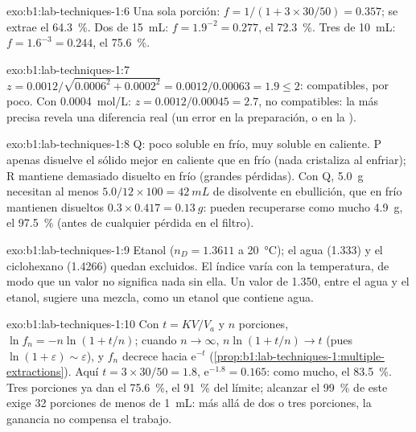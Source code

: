 \begin{solution}{exo:b1:lab-techniques-1:6}
Una sola porción: $f = 1/(1 + 3 \times 30/50) = 0.357$; se extrae el
\qty{64.3}{\percent}. Dos de \qty{15}{mL}: $f = 1.9^{-2} = 0.277$, el
\qty{72.3}{\percent}. Tres de \qty{10}{mL}: $f = 1.6^{-3} = 0.244$, el
\qty{75.6}{\percent}.
\end{solution}

\begin{solution}{exo:b1:lab-techniques-1:7}
$z = 0.0012/\sqrt{0.0006^2 + 0.0002^2} = 0.0012/0.00063 = 1.9 \le 2$:
compatibles, por poco. Con \qty{0.0004}{mol/L}: $z = 0.0012/0.00045 = 2.7$,
no compatibles: la  más precisa revela una diferencia real (un
error en la preparación, o en la ).
\end{solution}

\begin{solution}{exo:b1:lab-techniques-1:8}
Q: poco soluble en frío, muy soluble en caliente. P apenas disuelve el
sólido mejor en caliente que en frío (nada cristaliza al enfriar); R
mantiene demasiado disuelto en frío (grandes pérdidas). Con Q,
\qty{5.0}{g} necesitan al menos $5.0/12 \times 100 = \qty{42}{mL}$ de
disolvente en ebullición, que en frío mantienen disueltos
$0.3 \times 0.417 = \qty{0.13}{g}$: pueden recuperarse como mucho
\qty{4.9}{g}, el \qty{97.5}{\percent} (antes de cualquier pérdida en el
filtro).
\end{solution}

\begin{solution}{exo:b1:lab-techniques-1:9}
Etanol ($n_D = 1.3611$ a \qty{20}{\celsius}); el agua (1.333) y el
ciclohexano (1.4266) quedan excluidos. El índice varía con la
temperatura, de modo que un valor no significa nada sin ella. Un valor
de 1.350, entre el agua y el etanol, sugiere una mezcla, como un etanol
que contiene agua.
\end{solution}

\begin{solution}{exo:b1:lab-techniques-1:10}
Con $t = KV/V_a$ y $n$ porciones, $\ln f_n = -n\ln(1 + t/n)$; cuando
$n \to \infty$, $n \ln(1 + t/n) \to t$ (pues $\ln(1 + \varepsilon) \sim
\varepsilon$), y $f_n$ decrece hacia $\mathrm{e}^{-t}$
(\cref{prop:b1:lab-techniques-1:multiple-extractions}). Aquí
$t = 3 \times 30/50 = 1.8$, $\mathrm{e}^{-1.8} = 0.165$: como mucho, el
\qty{83.5}{\percent}. Tres porciones ya dan el \qty{75.6}{\percent}, el
\qty{91}{\percent} del límite; alcanzar el \qty{99}{\percent} de este
exige 32 porciones de menos de \qty{1}{mL}: más allá de dos o tres
porciones, la ganancia no compensa el trabajo.
\end{solution}

